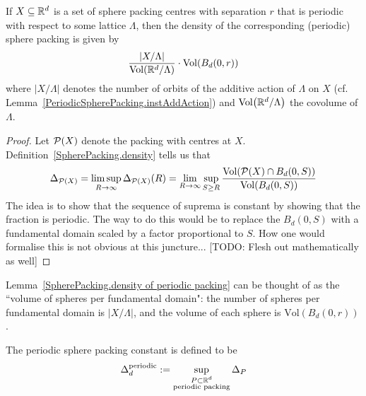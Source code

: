 \begin{lemma}\label{SpherePacking.density of periodic packing}\notready
  If $X \subseteq \mathbb{R}^d$ is a set of sphere packing centres with separation $r$ that is periodic with respect to some lattice $\Lambda$, then the density of the corresponding (periodic) sphere packing is given by
  \begin{equation}
    \frac{\lvert {X/\Lambda} \rvert}{\mathrm{Vol}(\mathbb{R}^d / \Lambda)} \cdot \mathrm{Vol}(B_d(0,r))
    \label{eq:periodic_packing_density_formula}
  \end{equation}
  where %
  $\lvert X / \Lambda \rvert$ denotes the number of orbits of the additive action of $\Lambda$ on $X$ (cf. Lemma~\ref{PeriodicSpherePacking.instAddAction}) and $\operatorname{Vol}\!\left(\mathbb{R}^d / \Lambda\right)$ the covolume of $\Lambda$.
\end{lemma}
\begin{proof}
  Let $\mathcal{P}(X)$ denote the packing with centres at $X$. Definition~\ref{SpherePacking.density} tells us that
  \[
    \Delta_{\mathcal{P}(X)} = \limsup_{R \to \infty} \Delta_{\mathcal{P}(X)}(R) = \lim_{R \to \infty} \sup_{S \geq R} \frac{\operatorname{Vol}\!\left(\mathcal{P}(X) \cap B_d(0, S)\right)}{\operatorname{Vol}\!\left(B_d(0, S)\right)}
  \]
  The idea is to show that the sequence of suprema is constant by showing that the fraction is periodic. The way to do this would be to replace the $B_d(0, S)$ with a fundamental domain scaled by a factor proportional to $S$. How one would formalise this is not obvious at this juncture... [TODO: Flesh out mathematically as well]
\end{proof}

\begin{remark}
  Lemma~\ref{SpherePacking.density of periodic packing} can be thought of as the ``volume of spheres per fundamental domain": the number of spheres per fundamental domain is $\lvert {X/\Lambda} \rvert$, and the volume of each sphere is $\mathrm{Vol}(B_d(0,r))$.
\end{remark}

\begin{definition}\label{def-Periodic-sphere-packing-constant}\notready
    The periodic sphere packing constant is defined to be
    $$ \Delta_{d}^{\text{periodic}} := \sup_{\substack{P \subset \mathbb{R}^d \\ \text{periodic packing}}} \Delta_P$$
\end{definition}

